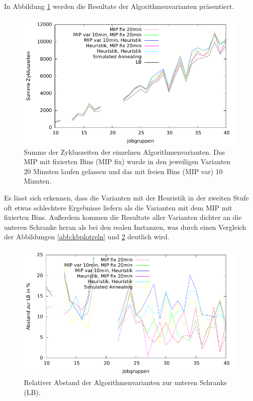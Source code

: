 \documentclass{scrreprt}
\begin{document}
In Abbildung \ref{abb:plot2} werden die Resultate der Algorithmenvarianten präsentiert.
\begin{figure}
    \begin{center}
        \includegraphics[width=.8\textwidth]{../prog/binpacking/results/plot.pdf}
    \end{center}
    \caption{
        \label{abb:plot2}
        Summe der Zykluszeiten der einzelnen Algorithmenvarianten. 
        Das MIP mit fixierten Bins (MIP fix) wurde in den jeweiligen Varianten 20 Minuten laufen gelassen und das mit freien Bins (MIP var) 10 Minuten.
    }
\end{figure}
Es lässt sich erkennen, dass die Varianten mit der Heuristik in der zweiten Stufe oft etwas schlechtere Ergebnisse liefern als die Varianten mit dem MIP mit fixierten Bins.
Außerdem kommen die Resultate aller Varianten dichter an die unteren Schranke heran als bei den realen Instanzen,
was durch einen Vergleich der Abbildungen \ref{abb:kbplotreln} und \ref{abb:plotrel} deutlich wird.
\begin{figure}
    \begin{center}
        \includegraphics[width=.8\textwidth]{../prog/binpacking/results/plotrel.pdf}
    \end{center}
    \caption{
        \label{abb:plotrel}
        Relativer Abstand der Algorithmenvarianten zur unteren Schranke (LB).
    }
\end{figure}
\end{document}
